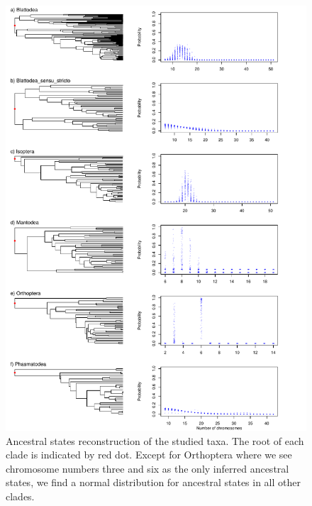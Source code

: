 \newpage
\begin{figure}
\centering \includegraphics[width=.7\textwidth]{figures/asr_plot.pdf}
\caption{Ancestral states reconstruction of the studied taxa. The root of each clade is indicated by red dot. Except for Orthoptera where we see chromosome numbers three and six as the only inferred ancestral states, we find a normal distribution for ancestral states in all other clades.}
\label{fig:asr}
\end{figure}

\newpage

